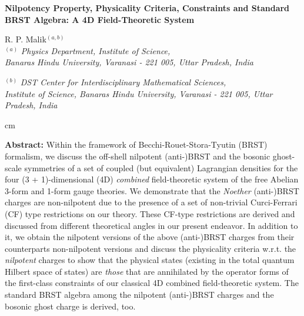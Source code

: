 \documentclass[12pt]{article}
\begin{document}
\begin{center}
{\bf {\large{Nilpotency Property, Physicality Criteria, Constraints and Standard BRST Algebra: A  4D Field-Theoretic System}}}

\vskip 3.4cm




{\sf  R. P. Malik$^{(a,b)}$}\\
$^{(a)}$ {\it Physics Department, Institute of Science,}\\
{\it Banaras Hindu University, Varanasi - 221 005, Uttar Pradesh, India}\\

\vskip 0.1cm






$^{(b)}$ {\it DST Center for Interdisciplinary Mathematical Sciences,}\\
{\it Institute of Science, Banaras Hindu University, Varanasi - 221 005, Uttar Pradesh,  India}\\
{\small {}}
\end{center}

 cm

\noindent
{\bf Abstract:}
Within the framework of Becchi-Rouet-Stora-Tyutin (BRST) formalism, we discuss the off-shell nilpotent (anti-)BRST  and the bosonic ghost-scale
symmetries of a set of coupled (but equivalent) Lagrangian densities for the four (3 + 1)-dimensional (4D) {\it combined} field-theoretic  system
of the free Abelian 3-form and 1-form gauge theories. We demonstrate that the {\it Noether} (anti-)BRST  charges are
non-nilpotent due to the presence of a set of non-trivial Curci-Ferrari (CF) type restrictions on our theory. These CF-type restrictions
are derived and discussed from different theoretical angles in our present endeavor. In addition to it, we obtain the nilpotent
versions of the above (anti-)BRST charges from their  counterparts non-nilpotent versions and discuss the physicality criteria w.r.t. the 
{\it nilpotent} charges to show that the physical states (existing in the total quantum Hilbert space of states) 
are {\it those} that are annihilated by the operator forms of the first-class constraints of our classical 4D combined
field-theoretic system. The standard BRST algebra among the nilpotent (anti-)BRST charges
and the bosonic ghost charge is  derived, too.
\end{document}

